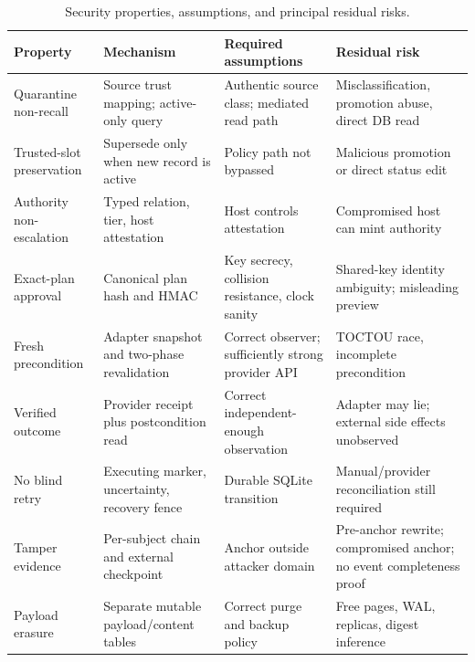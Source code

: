 \begin{table}[t]
\centering
\caption{Security properties, assumptions, and principal residual risks.}
\label{tab:security-summary}
\scriptsize
\begin{tabularx}{\textwidth}{@{}p{24mm}Y Y Y@{}}
\toprule
Property & Mechanism & Required assumptions & Residual risk \\
\midrule
Quarantine non-recall & Source trust mapping; active-only query & Authentic source class; mediated read path & Misclassification, promotion abuse, direct DB read \\
Trusted-slot preservation & Supersede only when new record is active & Policy path not bypassed & Malicious promotion or direct status edit \\
Authority non-escalation & Typed relation, tier, host attestation & Host controls attestation & Compromised host can mint authority \\
Exact-plan approval & Canonical plan hash and HMAC & Key secrecy, collision resistance, clock sanity & Shared-key identity ambiguity; misleading preview \\
Fresh precondition & Adapter snapshot and two-phase revalidation & Correct observer; sufficiently strong provider API & TOCTOU race, incomplete precondition \\
Verified outcome & Provider receipt plus postcondition read & Correct independent-enough observation & Adapter may lie; external side effects unobserved \\
No blind retry & Executing marker, uncertainty, recovery fence & Durable SQLite transition & Manual/provider reconciliation still required \\
Tamper evidence & Per-subject chain and external checkpoint & Anchor outside attacker domain & Pre-anchor rewrite; compromised anchor; no event completeness proof \\
Payload erasure & Separate mutable payload/content tables & Correct purge and backup policy & Free pages, WAL, replicas, digest inference \\
\bottomrule
\end{tabularx}
\end{table}

